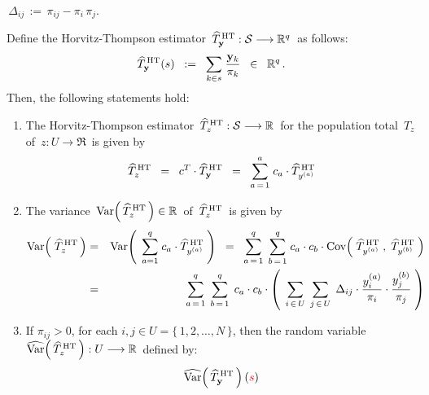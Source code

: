 \begin{proposition}
\begin{itemize}
	\,$\Delta_{ij} \, := \, \pi_{ij} - \pi_{i}\,\pi_{j}$.
\end{itemize}
Define the Horvitz-Thompson estimator
\,$\widehat{T}^{\,\textnormal{HT}}_{\mathbf{y}} : \mathcal{S} \longrightarrow \Re^{q}$\,
as follows:
\begin{equation*}
\widehat{T}^{\,\textnormal{HT}}_{\mathbf{y}}(s)
\;\; := \;\;
	\underset{k \in s}{\sum}\;\dfrac{\mathbf{y}_{k}}{\pi_{k}}
	\;\; \in \;\;
	\Re^{q}\,.
\end{equation*}
Then, the following statements hold:
\begin{enumerate}
\item
	The Horvitz-Thompson estimator
	\,$\widehat{T}^{\,\textnormal{HT}}_{z} : \mathcal{S} \longrightarrow \Re$\,
	for the population total \,$T_{z}$\, of \,$z : U \longrightarrow \Re$\, is given by
	\begin{equation*}
	\widehat{T}^{\,\textnormal{HT}}_{z}
	\;\; = \;\;
		c^{T} \cdot \widehat{T}^{\,\textnormal{HT}}_{\mathbf{y}}
	\;\; = \;\;
		\overset{a}{\underset{a\,=\,1}{\sum}} \; c_{a} \cdot \widehat{T}^{\,\textnormal{HT}}_{y^{(a)}}
	\end{equation*}
\item
	The variance
	\,$\Var\!\left(\,\widehat{T}^{\,\textnormal{HT}}_{z}\,\right) \in \Re$\,
	of \,$\widehat{T}^{\,\textnormal{HT}}_{z}$\, is given by
	\begin{eqnarray*}
	\Var\!\left(\;\widehat{T}^{\,\textnormal{HT}}_{z}\,\right)
	& = &
		\Var\!\left(\;\, \overset{q}{\underset{a=1}{\sum}}\; c_{a}\cdot\widehat{T}^{\,\textnormal{HT}}_{y^{(a)}} \;\right)
	\;\; = \;\;
		\overset{q}{\underset{a\,=\,1}{\sum}}\;\,
		\overset{q}{\underset{b\,=\,1}{\sum}}\;
		c_{a} \cdot c_{b} \cdot
		\Cov\!\left(\; \widehat{T}^{\,\textnormal{HT}}_{y^{(a)}} \;,\; \widehat{T}^{\,\textnormal{HT}}_{y^{(b)}} \;\right)
	\\
	& = &
		\overset{q}{\underset{a\,=\,1}{\sum}}\;\,
		\overset{q}{\underset{b\,=\,1}{\sum}}\;\,
		c_{a} \cdot c_{b} \cdot
		\left(\;\,
			\underset{i\,\in\,U}{\sum}\;\,
			\underset{j\,\in\,U}{\sum}\;\,
			\Delta_{ij} \cdot \dfrac{y^{(a)}_{i}}{\pi_{i}} \cdot \dfrac{y^{(b)}_{j}}{\pi_{j}}
		\;\right)
	\end{eqnarray*}
\item
	If $\pi_{ij} > 0$, for each $i , j \in U = \{\,1,2,\ldots,N\,\}$, then the random variable
	\,$\widehat{\Var}\!\left(\,\widehat{T}^{\,\textnormal{HT}}_{z}\,\right) : U \longrightarrow \Re$\,
	defined by:
	\begin{equation*}
	\widehat{\Var}\!\left(\,\widehat{T}^{\,\textnormal{HT}}_{\mathbf{y}}\,\right)({\color{red}s})

\end{equation*}
\end{enumerate}
\end{proposition}
